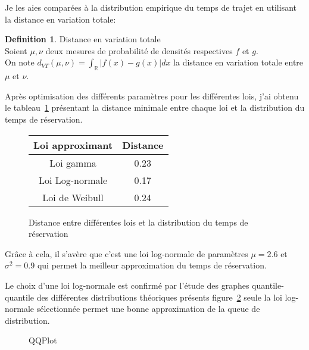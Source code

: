 \documentclass[12pt,a4paper]{article}
\theoremstyle{definition}
\newtheorem{definition}{Definition}
\begin{document}
{Je les aies comparées à la distribution empirique du temps de trajet en utilisant la distance en variation totale:

\begin{definition}{Distance en variation totale}\\
Soient $\mu,\nu$ deux mesures de probabilité de densités respectives $f$ et $g$.\\
On note $\displaystyle d_{VT}(\mu,\nu) = \int_{\mathbb{R}}|f(x)-g(x)|dx$ la distance en variation totale entre $\mu$ et $\nu$.
\end{definition}

Après optimisation des différents paramètres pour les différentes lois, j'ai obtenu le tableau~\ref{Distance_à_temps_réservation} présentant la distance minimale entre chaque loi et la distribution du temps de réservation.

\begin{figure}[h]
\centering
\begin{tabular}{c|c}
Loi approximant & Distance\\
\hline
Loi gamma &  0.23\\
Loi Log-normale & 0.17 \\
Loi de Weibull & 0.24\\
\end{tabular}
\caption{Distance entre différentes lois et la distribution du temps de réservation}
\label{Distance_à_temps_réservation}
\end{figure}

Grâce à cela, il s'avère que c'est une loi log-normale de paramètres $\mu = 2.6$ et $\sigma^2=0.9$ qui permet la meilleur approximation du temps de réservation.

Le choix d'une loi log-normale est confirmé par l'étude des graphes quantile-quantile des différentes distributions théoriques présents figure~\ref{Qplot} seule la loi log-normale sélectionnée permet une bonne approximation de la queue de distribution.



\begin{figure}[h]
\label{Qplot}
\centering
{}
\caption{QQPlot}
\end{figure}

}
\end{document}
